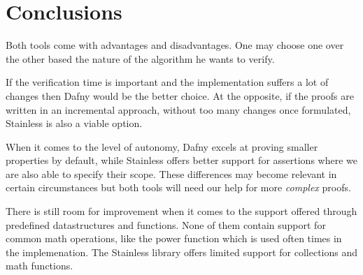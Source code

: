 \chapter*{Conclusions} 

Both tools come with advantages and disadvantages. One may choose one over the other
based the nature of the algorithm he wants to verify. 

If the verification time is important and the implementation suffers a lot of changes
then Dafny would be the better choice. At the opposite, if the proofs are written in an 
incremental approach, without too many changes once formulated, Stainless is also a viable option.

When it comes to the level of autonomy, Dafny excels at proving smaller properties 
by default, while Stainless offers better support for assertions where we are also
able to specify their scope. These differences may become relevant in certain circumstances but
both tools will need our help for more \emph{complex} proofs.

There is still room for improvement when it comes to the support offered through predefined
datastructures and functions.
None of them contain support for common math operations, like the power function which is used often
times in the implemenation. The Stainless library offers limited support for collections and math
functions.